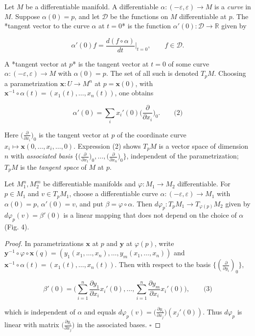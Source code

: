 \begin{definition}
  \label{def:dc-ch0-2-6}
  \leanok
  Let $M$ be a differentiable manifold. A differentiable
  $\alpha:(-\varepsilon,\varepsilon)\to M$ is a \emph{curve} in $M$. Suppose
  $\alpha(0)=p$, and let $\mathcal{D}$ be the functions on $M$ differentiable at
  $p$. The *tangent vector to the curve $\alpha$ at $t=0$* is the function
  $\alpha'(0):\mathcal{D}\to\mathbb{R}$ given by
  
  $$
  \alpha'(0)f=\frac{d(f\circ\alpha)}{dt}\Big|_{t=0},\qquad f\in\mathcal{D}.
  $$
  
  A *tangent vector at $p$* is the tangent vector at $t=0$ of some curve
  $\alpha:(-\varepsilon,\varepsilon)\to M$ with $\alpha(0)=p$. The set of all such
  is denoted $T_pM$. Choosing a parametrization $\mathbf{x}:U\to M^n$ at
  $p=\mathbf{x}(0)$, with $\mathbf{x}^{-1}\circ\alpha(t)=(x_1(t),\dots,x_n(t))$,
  one obtains
  
  $$
  \alpha'(0)=\sum_i x_i'(0)\Big(\frac{\partial}{\partial x_i}\Big)_0.\qquad\text{(2)}
  $$
  
  Here $\big(\frac{\partial}{\partial x_i}\big)_0$ is the tangent vector at $p$ of
  the coordinate curve $x_i\mapsto\mathbf{x}(0,\dots,x_i,\dots,0)$. Expression (2)
  shows $T_pM$ is a vector space of dimension $n$ with \emph{associated basis}
  $\big\{\big(\frac{\partial}{\partial x_1}\big)_0,\dots,\big(\frac{\partial}{\partial x_n}\big)_0\big\}$,
  independent of the parametrization; $T_pM$ is the \emph{tangent space} of $M$ at $p$.
\end{definition}

\begin{proposition}
  \label{prop:dc-ch0-2-7}
  \leanok
  Let $M_1^n,M_2^m$ be differentiable manifolds and $\varphi:M_1\to M_2$
  differentiable. For $p\in M_1$ and $v\in T_pM_1$, choose a differentiable curve
  $\alpha:(-\varepsilon,\varepsilon)\to M_1$ with $\alpha(0)=p$, $\alpha'(0)=v$, and
  put $\beta=\varphi\circ\alpha$. Then
  $d\varphi_p:T_pM_1\to T_{\varphi(p)}M_2$ given by $d\varphi_p(v)=\beta'(0)$ is a
  linear mapping that does not depend on the choice of $\alpha$ (Fig. 4).
\end{proposition}
\begin{proof}
  \leanok
  In parametrizations $\mathbf{x}$ at $p$ and $\mathbf{y}$ at $\varphi(p)$,
  write $\mathbf{y}^{-1}\circ\varphi\circ\mathbf{x}(q)=(y_1(x_1,\dots,x_n),\dots,y_m(x_1,\dots,x_n))$
  and $\mathbf{x}^{-1}\circ\alpha(t)=(x_1(t),\dots,x_n(t))$. Then with respect to
  the basis $\{(\frac{\partial}{\partial y_i})_0\}$,
  
  $$
  \beta'(0)=\Big(\sum_{i=1}^n\frac{\partial y_1}{\partial x_i}x_i'(0),\dots,\sum_{i=1}^n\frac{\partial y_m}{\partial x_i}x_i'(0)\Big),\qquad\text{(3)}
  $$
  
  which is independent of $\alpha$ and equals
  $d\varphi_p(v)=\big(\frac{\partial y_i}{\partial x_j}\big)(x_j'(0))$. Thus
  $d\varphi_p$ is linear with matrix $\big(\frac{\partial y_i}{\partial x_j}\big)$
  in the associated bases. $\square$
\end{proof}

